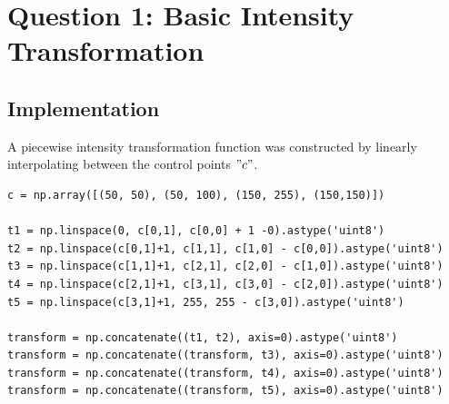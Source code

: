 \documentclass[12pt]{article}
\begin{document}

\newpage


\section{Question 1: Basic Intensity Transformation}
\subsection{Implementation}
A piecewise intensity transformation function was constructed by linearly interpolating between the control points $"c"$.

\begin{lstlisting}[style=pythonstyle]
c = np.array([(50, 50), (50, 100), (150, 255), (150,150)])

t1 = np.linspace(0, c[0,1], c[0,0] + 1 -0).astype('uint8')
t2 = np.linspace(c[0,1]+1, c[1,1], c[1,0] - c[0,0]).astype('uint8')
t3 = np.linspace(c[1,1]+1, c[2,1], c[2,0] - c[1,0]).astype('uint8')
t4 = np.linspace(c[2,1]+1, c[3,1], c[3,0] - c[2,0]).astype('uint8')
t5 = np.linspace(c[3,1]+1, 255, 255 - c[3,0]).astype('uint8')

transform = np.concatenate((t1, t2), axis=0).astype('uint8')
transform = np.concatenate((transform, t3), axis=0).astype('uint8')
transform = np.concatenate((transform, t4), axis=0).astype('uint8')
transform = np.concatenate((transform, t5), axis=0).astype('uint8')
\end{lstlisting}
\end{document}
